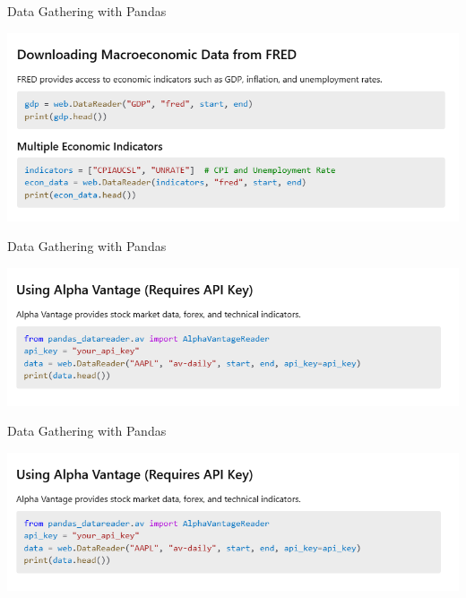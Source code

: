 \documentclass[11pt]{beamer}
\begin{document}
\begin{frame}{Data Gathering with Pandas}
	\begin{center}
	\includegraphics[scale=0.55]{../05-pictures/lesson-1-3_pic_3.png}
	\end{center}
\end{frame}
\begin{frame}{Data Gathering with Pandas}
	\begin{center}
	\includegraphics[scale=0.55]{../05-pictures/lesson-1-3_pic_4.png}
	\end{center}
\end{frame}
\begin{frame}{Data Gathering with Pandas}
	\begin{center}
	\includegraphics[scale=0.55]{../05-pictures/lesson-1-3_pic_5.png}
	\end{center}
\end{frame}
\end{document}
